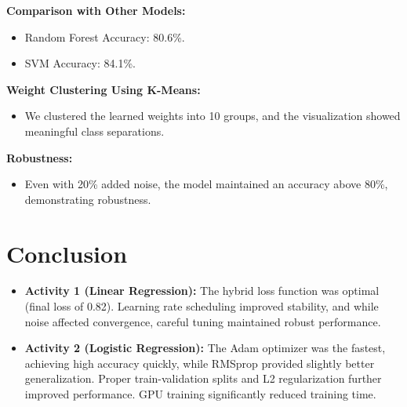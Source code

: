 \documentclass[11pt]{article}
\begin{document}
\textbf{Comparison with Other Models:}
\begin{itemize}
    \item Random Forest Accuracy: 80.6\%.
    \item SVM Accuracy: 84.1\%.
\end{itemize}

\textbf{Weight Clustering Using K-Means:}
\begin{itemize}
    \item We clustered the learned weights into 10 groups, and the visualization showed meaningful class separations.
\end{itemize}

\textbf{Robustness:}
\begin{itemize}
    \item Even with 20\% added noise, the model maintained an accuracy above 80\%, demonstrating robustness.
\end{itemize}

\section{Conclusion}
\begin{itemize}
    \item \textbf{Activity 1 (Linear Regression):}  
    The hybrid loss function was optimal (final loss of 0.82). Learning rate scheduling improved stability, and while noise affected convergence, careful tuning maintained robust performance.
    \item \textbf{Activity 2 (Logistic Regression):}  
    The Adam optimizer was the fastest, achieving high accuracy quickly, while RMSprop provided slightly better generalization. Proper train-validation splits and L2 regularization further improved performance. GPU training significantly reduced training time.
\end{itemize}
\end{document}
